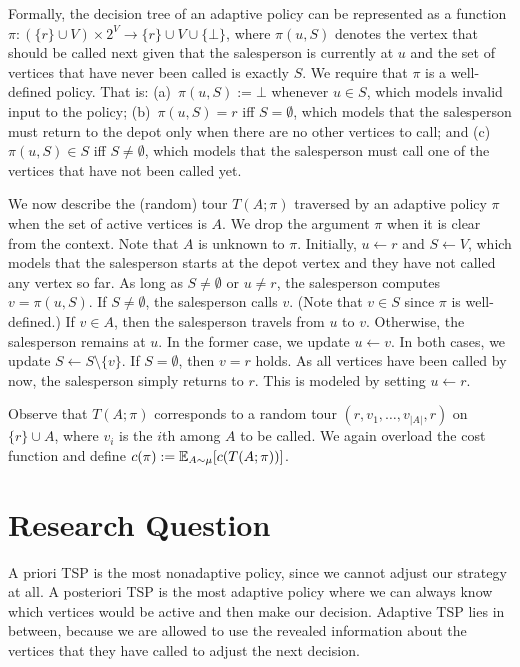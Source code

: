 \documentclass[12pt]{amsart}
\begin{document}
\begin{enumerate}
        Formally, the decision tree of an adaptive policy can be represented as a function $\pi: (\{r\} \cup V) \times 2^V \rightarrow \{r\} \cup V \cup \{\bot\}$, where $\pi(u,S)$ denotes the vertex that should be called next given that the salesperson is currently at $u$ and the set of vertices that have never been called is exactly $S$. 
        We require that $\pi$ is a well-defined policy.
        That is: (a)~$\pi(u,S) := \bot$ whenever $u \in S$, which models invalid input to the policy; (b)~$\pi(u,S) = r$ iff $S = \emptyset$, which models that the salesperson must return to the depot only when there are no other vertices to call; and (c)~$\pi(u,S) \in S$ iff $S \neq \emptyset$, which models that the salesperson must call one of the vertices that have not been called yet. 

        We now describe the (random) tour $T(A;\pi)$ traversed by an adaptive policy $\pi$ when the set of active vertices is $A$.  
        We drop the argument $\pi$ when it is clear from the context. 
        Note that $A$ is unknown to $\pi$. 
        Initially, $u \leftarrow r$ and $S \leftarrow V$, which models that the salesperson starts at the depot vertex and they have not called any vertex so far.  
        As long as $S \neq \emptyset$ or $u \neq r$, the salesperson computes $v = \pi(u,S)$. 
        If $S \neq \emptyset$, the salesperson calls $v$. 
        (Note that $v \in S$ since $\pi$ is well-defined.) 
        If $v \in A$, then the salesperson travels from $u$ to $v$. 
        Otherwise, the salesperson remains at $u$. 
        In the former case, we update $u \leftarrow v$.
        In both cases, we update $S \leftarrow S \setminus \{v\}$.
        If $S = \emptyset$, then $v = r$ holds.
        As all vertices have been called by now, the salesperson simply returns to $r$. 
        This is modeled by setting $u \leftarrow r$.
        
        Observe that $T(A;\pi)$ corresponds to a random tour $(r,v_1,\ldots,v_{|A|},r)$ on $\{r\} \cup A$, where $v_i$ is the $i$th among $A$ to be called. 
        We again overload the cost function and define $c(\pi) := \mathbb{E}_{A \sim \mu}[c(T(A;\pi))]$.   
        
\end{enumerate}

\section{Research Question}
A priori TSP is the most nonadaptive policy, since we cannot adjust our strategy at all.
A posteriori TSP is the most adaptive policy where we can always know which vertices would be active and then make our decision.
Adaptive TSP lies in between, because we are allowed to use the revealed information about the vertices that they have called to adjust the next decision.
\end{document}
